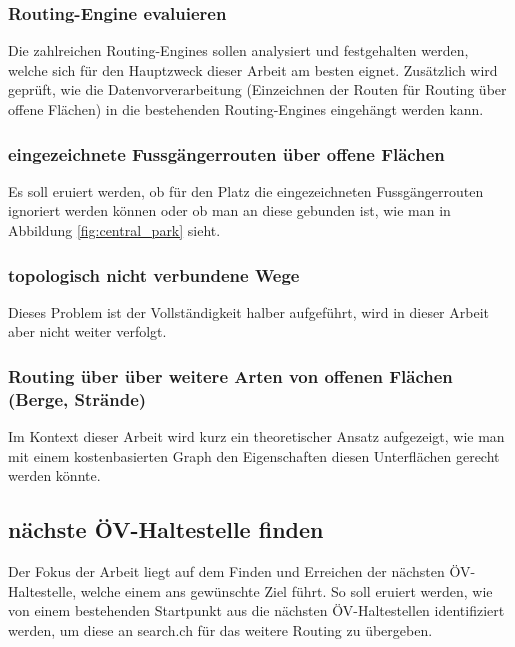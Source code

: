 \subsubsection{Routing-Engine evaluieren}
\label{target:Routing-Enginge evaluieren}
Die zahlreichen Routing-Engines sollen analysiert und festgehalten werden, welche sich für den Hauptzweck dieser Arbeit am besten eignet. Zusätzlich wird geprüft, wie die Datenvorverarbeitung (Einzeichnen der Routen für Routing über offene Flächen) in die bestehenden Routing-Engines eingehängt werden kann. 

\subsubsection{eingezeichnete Fussgängerrouten über offene Flächen}
\label{target:eingezeichnete Fussgängerrouten über offene Flächen}
Es soll eruiert werden, ob für den Platz die eingezeichneten Fussgängerrouten ignoriert werden können oder ob man an diese gebunden ist, wie man in Abbildung \ref{fig:central_park} sieht.

\subsubsection{topologisch nicht verbundene Wege}
\label{target:topologisch nicht verbundene Wege}
Dieses Problem ist der Vollständigkeit halber aufgeführt, wird in dieser Arbeit aber nicht weiter verfolgt.

\subsubsection{Routing über über weitere Arten von offenen Flächen (Berge, Strände)}
\label{target:Routing über über weitere Arten von offenen Flächen (Berge, Strände)}
Im Kontext dieser Arbeit wird kurz ein theoretischer Ansatz aufgezeigt, wie man mit einem kostenbasierten Graph den Eigenschaften diesen Unterflächen gerecht werden könnte.

\subsection{nächste ÖV-Haltestelle finden}
\label{target:nächste ÖV-Haltestelle finden}
Der Fokus der Arbeit liegt auf dem Finden und Erreichen der nächsten ÖV-Haltestelle, welche einem ans gewünschte Ziel führt. So soll eruiert werden, wie von einem bestehenden Startpunkt aus die nächsten ÖV-Haltestellen identifiziert werden, um diese an search.ch für das weitere Routing zu übergeben.
	
